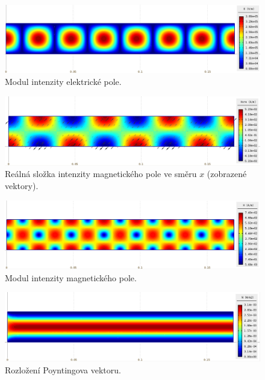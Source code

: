 \begin{figure}[!h]
	\centering
	\includegraphics[width=15cm]{priklad_R100_E.png}
	\caption{Modul intenzity elektrické pole.}
	\label{obr:priklad_R100_E}
\end{figure}
\begin{figure}[!h]
	\centering
	\includegraphics[width=15cm]{priklad_R100_Hre.png}
	\caption{Reálná složka intenzity magnetického pole ve směru $x$ (zobrazené vektory).}
	\label{obr:priklad_R100_Hre}
\end{figure}
\begin{figure}[!h]
	\centering
	\includegraphics[width=15cm]{priklad_R100_H.png}
	\caption{Modul intenzity magnetického pole.}
	\label{obr:priklad_R100_H}
\end{figure}
\begin{figure}[!h]
	\centering
	\includegraphics[width=15cm]{priklad_R100_N.png}
	\caption{Rozložení Poyntingova vektoru.}
	\label{obr:priklad_R100_N}
\end{figure}

